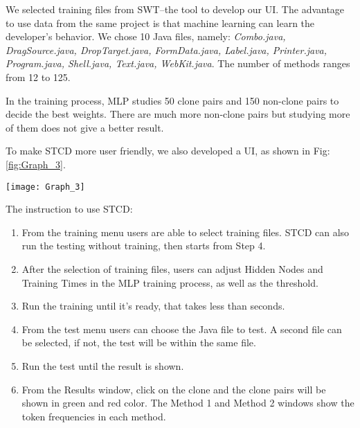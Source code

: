\documentclass[../main.tex]{subfiles}
\begin{document}
We selected training files from SWT--the tool to develop our UI. The advantage to use data from the same project is that machine learning can learn the developer's behavior. We chose 10 Java files, namely: \textit{Combo.java, DragSource.java, DropTarget.java, FormData.java, Label.java, Printer.java, Program.java, Shell.java, Text.java, WebKit.java}. The number of methods ranges from 12 to 125.

In the training process, MLP studies 50 clone pairs and 150 non-clone pairs to decide the best weights. There are much more non-clone pairs but studying more of them does not give a better result.

To make STCD more user friendly, we also developed a UI, as shown in Fig:\ref{fig:Graph_3}.

\begin{figure*}
\centering \texttt{[image: Graph\_3]} 
\caption{User Interface} \label{fig:Graph_3}
\end{figure*}

The instruction to use STCD:

\begin{enumerate}
\item From the training menu users are able to select training files. STCD can also run the testing without training, then starts from Step 4.
\item After the selection of training files, users can adjust Hidden Nodes and Training Times in the MLP training process, as well as the threshold. 
\item Run the training until it's ready, that takes less than seconds. 
\item From the test menu users can choose the Java file to test. A second file can be selected, if not, the test will be within the same file. 
\item Run the test until the result is shown.
\item From the Results window, click on the clone and the clone pairs will be shown in green and red color. The Method 1 and Method 2 windows show the token frequencies in each method.  
\end{enumerate}
\end{document}
